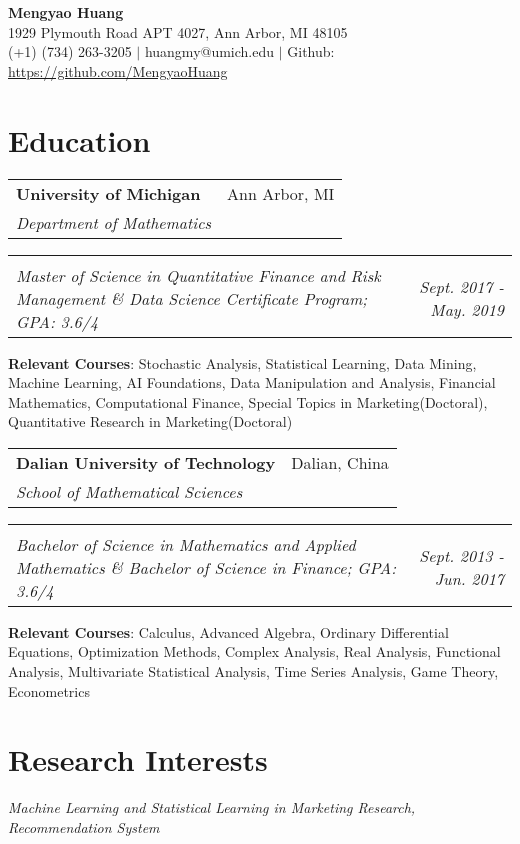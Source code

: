 \documentclass[letterpaper,10pt]{article}
\makeatletter
\newcommand{\resumeItemNoBullet}[2]{
  \item[]\small{
    \hspace{-9pt}\textbf{#1}{: #2 \vspace{-6pt}}
  }
}
\newcommand{\resumeSubheading}[4]{
  \vspace{-1pt}\item[]
  \begin{tabular*}{0.98\textwidth}{l@{\extracolsep{\fill}}r}
      \hspace{-10pt}\textbf{#1} & #2 \\
      \hspace{-10pt}\textit{\small#3} & \textit{\small #4} \\
    \end{tabular*}\vspace{-5pt}
}
\newcommand{\resumeSubHeadingListStart}{\begin{itemize}[leftmargin=*]}
\newcommand{\resumeSubHeadingListEnd}{\end{itemize}}
\newcommand{\shorterSection}[1]{\vspace{-10pt}\section{#1}}
\makeatother
\begin{document}
\begin{center}
  \small \textbf{{\LARGE Mengyao Huang}} \\    
  1929 Plymouth Road APT 4027, Ann Arbor, MI 48105 \\
  (+1) (734) 263-3205 $\vert$ huangmy@umich.edu $\vert$ Github: \href{https://github.com/MengyaoHuang}{https://github.com/MengyaoHuang}
\end{center}


\shorterSection{Education}
   \resumeSubHeadingListStart
    \resumeSubheading{University of Michigan}{Ann Arbor, MI}{Department of Mathematics}\hfill
    \vspace{-18pt}
    \resumeSubheading{}{}{Master of Science in Quantitative Finance and Risk Management \&
      Data Science Certificate Program;  GPA: 3.6/4}{Sept. 2017 - May. 2019}{        
      \resumeItemNoBullet{Relevant Courses}{Stochastic Analysis, Statistical Learning, Data Mining, Machine Learning, AI Foundations, Data  Manipulation and Analysis, Financial Mathematics, Computational Finance, Special Topics in Marketing(Doctoral), Quantitative Research in Marketing(Doctoral)}
    }
    \vspace{6pt}
    
    \resumeSubheading{Dalian University of Technology}{Dalian, China}{School of Mathematical Sciences}\hfill
    \vspace{-18pt}
    \resumeSubheading{}{}{Bachelor of Science in Mathematics and Applied Mathematics \& 
      	Bachelor of Science in Finance;  GPA: 3.6/4}{Sept. 2013 - Jun. 2017}
	 \resumeItemNoBullet{Relevant Courses}{Calculus, Advanced Algebra, Ordinary Differential Equations, Optimization Methods, Complex Analysis, Real Analysis, Functional Analysis, Multivariate Statistical Analysis, Time Series Analysis, Game Theory, Econometrics}
   \resumeSubHeadingListEnd
\vspace{8pt}


\shorterSection{Research Interests}
    \resumeSubHeadingListStart
   \hspace{-12pt}
   {\small \sl Machine Learning and Statistical Learning in Marketing Research, Recommendation System}
     \resumeSubHeadingListEnd
\vspace{0pt}
\end{document}
